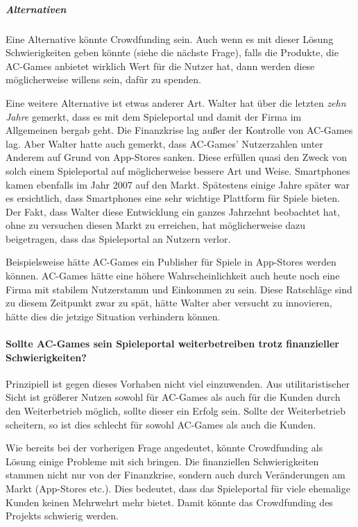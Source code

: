 \subparagraph*{Alternativen}

Eine Alternative könnte Crowdfunding sein. 
Auch wenn es mit dieser Lösung Schwierigkeiten geben könnte (siehe die nächste Frage),
falls die Produkte, die AC-Games anbietet wirklich Wert für die Nutzer hat, dann werden diese möglicherweise willens sein, dafür zu spenden.

Eine weitere Alternative ist etwas anderer Art.
Walter hat über die letzten \emph{zehn Jahre} gemerkt, dass es mit dem Spieleportal und damit der Firma im Allgemeinen bergab geht.
Die Finanzkrise lag außer der Kontrolle von AC-Games lag. Aber Walter hatte auch gemerkt, 
dass AC-Games' Nutzerzahlen unter Anderem auf Grund von App-Stores sanken. 
Diese erfüllen quasi den Zweck von solch einem Spieleportal auf möglicherweise bessere Art und Weise.
Smartphones kamen ebenfalls im Jahr 2007 auf den Markt.
Spätestens einige Jahre später war es ersichtlich, dass Smartphones eine sehr wichtige Plattform für Spiele bieten.
Der Fakt, dass Walter diese Entwicklung ein ganzes Jahrzehnt beobachtet hat, ohne zu versuchen diesen Markt zu erreichen, 
hat möglicherweise dazu beigetragen, dass das Spieleportal an Nutzern verlor.

Beispielsweise hätte AC-Games ein Publisher für Spiele in App-Stores werden können.
AC-Games hätte eine höhere Wahrscheinlichkeit auch heute noch eine Firma mit stabilem Nutzerstamm und Einkommen zu sein.
Diese Ratschläge sind zu diesem Zeitpunkt zwar zu spät, hätte Walter aber versucht zu innovieren, hätte dies die jetzige Situation verhindern können.

\paragraph*{Sollte AC-Games sein Spieleportal weiterbetreiben trotz finanzieller Schwierigkeiten? \cite{kees_faites_2017}}

Prinzipiell ist gegen dieses Vorhaben nicht viel einzuwenden.
Aus utilitaristischer Sicht ist größerer Nutzen sowohl für AC-Games als auch für die Kunden durch den Weiterbetrieb möglich, sollte dieser ein Erfolg sein.
Sollte der Weiterbetrieb scheitern, so ist dies schlecht für sowohl AC-Games als auch die Kunden.

Wie bereits bei der vorherigen Frage angedeutet, könnte Crowdfunding als Lösung einige Probleme mit sich bringen.
Die finanziellen Schwierigkeiten stammen nicht nur von der Finanzkrise, sondern auch durch Veränderungen am Markt (App-Stores etc.).
Dies bedeutet, dass das Spieleportal für viele ehemalige Kunden keinen Mehrwehrt mehr bietet.
Damit könnte das Crowdfunding des Projekts schwierig werden. 

